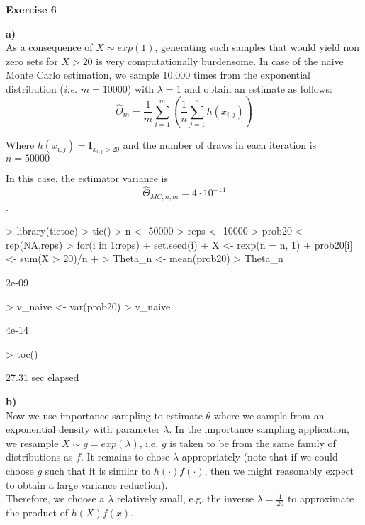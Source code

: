 \documentclass{article}
\begin{document}
\newpage
\textbf{Exercise 6} 

\textbf{a)}\\

As a consequence of $X \sim exp(1)$, generating such samples that would yield non zero sets for $X>20$ is very computationally burdensome. In case of the naive Monte Carlo estimation, we sample 10,000 times from the exponential distribution (\textit{i.e.} $m=10000$) with $\lambda=1$ and obtain an estimate as follows:
\begin{equation}
\hat{\Theta}_m = \frac{1}{m}\sum_{i=1}^{m}\left(\frac{1}{n}\sum_{j=1}^n h(x_{i,j})\right)
\end{equation}

Where $h(x_{i,j})=\mathbf{I}_{x_{i,j}>20}$ and the number of draws in each iteration is $n=50000$

In this case, the estimator variance  is $$\hat{\Theta}_{MC,n,m} = 4\cdot 10^{-14}$$.

\begin{Schunk}
\begin{Sinput}
> library(tictoc)
> tic()
> n <- 50000
> reps <- 10000
> prob20 <- rep(NA,reps)
> for(i in 1:reps) {
+   set.seed(i)
+   X <- rexp(n = n, 1)
+   prob20[i] <- sum(X > 20)/n
+ }
> Theta_n <- mean(prob20)
> Theta_n
\end{Sinput}
\begin{Soutput}
[1] 2e-09
\end{Soutput}
\begin{Sinput}
> v_naive <- var(prob20)
> v_naive
\end{Sinput}
\begin{Soutput}
[1] 4e-14
\end{Soutput}
\begin{Sinput}
> toc()
\end{Sinput}
\begin{Soutput}
27.31 sec elapsed
\end{Soutput}
\end{Schunk}


\newpage
\textbf{b)}\\
Now we use importance sampling to estimate $\theta$ where we sample from an exponential density with parameter $\lambda$. 
In the importance sampling application, we resample $X\sim g = exp(\lambda)$, i.e. $g$ is taken to be from the same family of distributions as $f$. It remains to chose $\lambda$ appropriately (note that if we could choose $g$ such that it is similar to $h(·)f(·)$, then we might reasonably expect to obtain a large variance reduction). \\
Therefore, we choose a $\lambda$ relatively small, e.g. the inverse $\lambda=\frac{1}{20}$ to approximate the product of $h(X)f(x)$. \\
\end{document}
